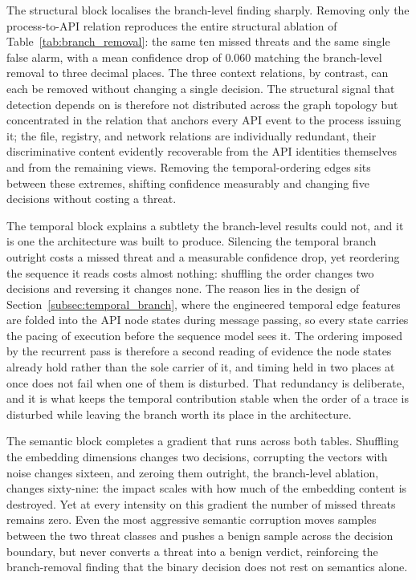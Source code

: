 \documentclass[%
    BCOR=10mm,
    DIV=13,
    toc=bibliography,
    toc=listof,
    oneside,
    12pt,
]{scrbook}
\begin{document}
The structural block localises the branch-level finding sharply. Removing
only the process-to-API relation reproduces the entire structural ablation of
Table~\ref{tab:branch_removal}: the same ten missed threats and the same
single false alarm, with a mean confidence drop of $0.060$ matching the
branch-level removal to three decimal places. The
three context relations, by contrast, can each be removed without changing a
single decision. The structural signal that detection depends on is therefore
not distributed across the graph topology but concentrated in the relation
that anchors every API event to the process issuing it; the file, registry,
and network relations are individually redundant, their discriminative
content evidently recoverable from the API identities themselves and from the
remaining views. Removing the temporal-ordering edges sits between these
extremes, shifting confidence measurably and changing five decisions without
costing a threat.

The temporal block explains a subtlety the branch-level results could not, and
it is one the architecture was built to produce. Silencing the temporal branch
outright costs a missed threat and a measurable confidence drop, yet reordering
the sequence it reads costs almost nothing: shuffling the order changes two
decisions and reversing it changes none. The reason lies in the design of
Section~\ref{subsec:temporal_branch}, where the engineered temporal edge
features are folded into the API node states during message passing, so every
state carries the pacing of execution before the sequence model sees it. The
ordering imposed by the recurrent pass is therefore a second reading of
evidence the node states already hold rather than the sole carrier of it, and
timing held in two places at once does not fail when one of them is disturbed.
That redundancy is deliberate, and it is what keeps the temporal contribution
stable when the order of a trace is disturbed while leaving the branch worth
its place in the architecture.

The semantic block completes a gradient that runs across both tables.
Shuffling the embedding dimensions changes two decisions, corrupting the
vectors with noise changes sixteen, and zeroing them outright, the
branch-level ablation, changes sixty-nine: the impact scales with how much of
the embedding content is destroyed. Yet at every intensity on this gradient
the number of missed threats remains zero. Even the most aggressive semantic
corruption moves samples between the two threat classes and pushes a benign
sample across the decision boundary, but never converts a threat into a
benign verdict, reinforcing the branch-removal finding that the binary
decision does not rest on semantics alone.
\end{document}
